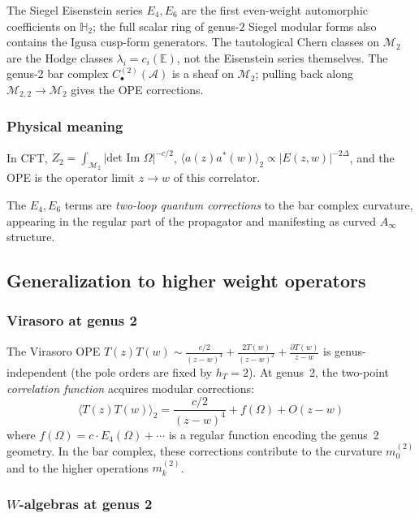 The Siegel Eisenstein series $E_4,E_6$ are the first even-weight
automorphic coefficients on $\mathbb H_2$; the full scalar ring of
genus-$2$ Siegel modular forms also contains the Igusa cusp-form
generators. The tautological Chern classes on $\mathcal M_2$ are the
Hodge classes $\lambda_i=c_i(\mathbb E)$, not the Eisenstein series
themselves. The genus-$2$ bar complex
$C_{\bullet}^{(2)}(\mathcal{A})$ is a sheaf on $\mathcal{M}_2$;
pulling back along $\mathcal{M}_{2,2} \to \mathcal{M}_2$ gives the
OPE corrections.

\subsubsection{Physical meaning}

In CFT, $Z_2 = \int_{\mathcal{M}_2} |\text{det Im } \Omega|^{-c/2}$,
$\langle a(z) a^*(w) \rangle_2 \propto |E(z,w)|^{-2\Delta}$,
and the OPE is the operator limit $z \to w$ of this correlator.

The $E_4, E_6$ terms are \emph{two-loop quantum corrections} to the bar complex curvature,
appearing in the regular part of the propagator and manifesting as curved $A_\infty$ structure.

\subsection{Generalization to higher weight operators}

\subsubsection{Virasoro at genus 2}

The Virasoro OPE $T(z) T(w) \sim \frac{c/2}{(z-w)^4} + \frac{2T(w)}{(z-w)^2} + \frac{\partial T(w)}{z-w}$
is genus-independent (the pole orders are fixed by $h_T = 2$). At genus~2, the
two-point \emph{correlation function} acquires modular corrections:
\[\langle T(z) T(w) \rangle_2 = \frac{c/2}{(z-w)^4} + f(\Omega) + O(z-w)\]
where $f(\Omega) = c \cdot E_4(\Omega) + \cdots$ is a regular function encoding the
genus~2 geometry. In the bar complex, these corrections contribute to the
curvature $m_0^{(2)}$ and to the higher operations $m_k^{(2)}$.

\subsubsection{\texorpdfstring{$W$-algebras at genus 2}{$\mathcal{W}$-algebras at genus 2}}

